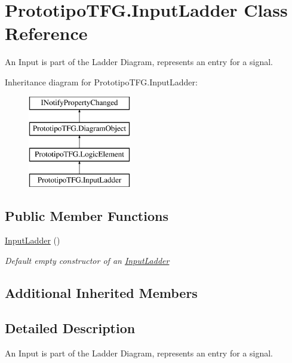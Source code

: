 \hypertarget{class_prototipo_t_f_g_1_1_input_ladder}{}\section{Prototipo\+T\+F\+G.\+Input\+Ladder Class Reference}
\label{class_prototipo_t_f_g_1_1_input_ladder}


An Input is part of the Ladder Diagram, represents an entry for a signal.  


Inheritance diagram for Prototipo\+T\+F\+G.\+Input\+Ladder\+:\begin{figure}[H]
\begin{center}
\leavevmode
\includegraphics[height=4.000000cm]{class_prototipo_t_f_g_1_1_input_ladder}
\end{center}
\end{figure}
\subsection*{Public Member Functions}
\begin{DoxyCompactItemize}
\item 
\hyperlink{class_prototipo_t_f_g_1_1_input_ladder_a4598273d987ea3736b44c0b1e8956a4e}{Input\+Ladder} ()
\begin{DoxyCompactList}\small\item\em Default empty constructor of an \hyperlink{class_prototipo_t_f_g_1_1_input_ladder}{Input\+Ladder} \end{DoxyCompactList}\end{DoxyCompactItemize}
\subsection*{Additional Inherited Members}


\subsection{Detailed Description}
An Input is part of the Ladder Diagram, represents an entry for a signal. 



